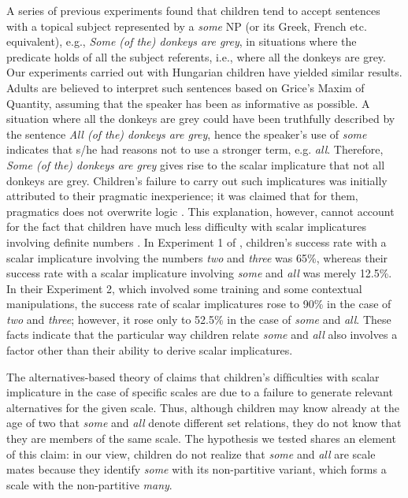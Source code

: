 \documentclass[output=paper]{langscibook}
\begin{document}
A series of previous experiments \citep[e.g.][]{noveck2001children,papafragou2003scalar,miller2005young,papafragouskordos16,pouscoulous2007developmental} found that children tend to accept sentences with a topical subject represented by a \textit{some} NP (or its Greek, French etc. equivalent), e.g., \textit{Some (of the) donkeys are grey}, in situations where the predicate holds of all the subject referents, i.e., where all the donkeys are grey. Our experiments carried out with Hungarian children have yielded similar results. Adults are believed to interpret such sentences based on Grice's Maxim of Quantity, assuming that the speaker has been as informative as possible. A situation where all the donkeys are grey could have been truthfully described by the sentence \textit{All (of the) donkeys are grey}, hence the speaker's use of \textit{some} indicates that s/he had reasons not to use a stronger term, e.g. \textit{all}. Therefore, \textit{Some (of the) donkeys are grey} gives rise to the scalar implicature that not all donkeys are grey. Children's failure to carry out such implicatures was initially attributed to their pragmatic inexperience; it was claimed that for them, pragmatics does not overwrite logic \citep{noveck2001children}. This explanation, however, cannot account for the fact that children have much less difficulty with scalar implicatures involving definite numbers \citep[cf. e.g.,][]{papafragou2003scalar,ekisszt18}. In Experiment 1 of \citet{papafragou2003scalar}, children’s success rate with a scalar implicature involving the numbers \textit{two} and \textit{three} was 65\%, whereas their success rate with a scalar implicature involving \textit{some} and \textit{all} was merely 12.5\%. In their Experiment 2, which involved some training and some contextual manipulations, the success rate of scalar implicatures rose to 90\% in the case of \textit{two} and \textit{three}; however, it rose only to 52.5\% in the case of \textit{some} and \textit{all}. These facts indicate that the particular way children relate \textit{some} and \textit{all} also involves a factor other than their ability to derive scalar implicatures.

The alternatives-based theory of \citet{barner2011accessing} claims that children’s difﬁculties with scalar implicature in the case of specific scales are due to a failure to generate relevant alternatives for the given scale. Thus, although children may know already at the age of two that \textit{some} and \textit{all} denote different set relations, they do not know that they are members of the same scale. The hypothesis we tested shares an element of this claim: in our view, children do not realize that \textit{some} and \textit{all} are scale mates because they identify \textit{some} with its non-partitive variant, which forms a scale with the non-partitive \textit{many}. 
\end{document}
